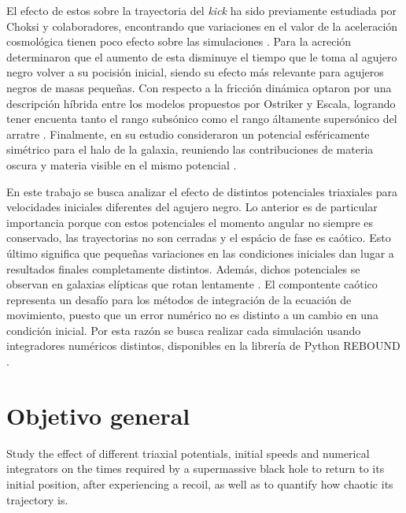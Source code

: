 	El efecto de estos sobre la trayectoria del \textit{kick} ha sido previamente estudiada por Choksi y colaboradores, encontrando que variaciones en el valor de la aceleraci\'on cosmol\'ogica tienen poco efecto sobre las simulaciones  \cite{choksi2017recoiling}. Para la acreci\'on determinaron que el aumento de esta disminuye el tiempo que le toma al agujero negro volver a su pocisi\'on inicial, siendo su efecto m\'as relevante para agujeros negros de masas peque\~nas. Con respecto a la fricci\'on din\'amica optaron por una descripci\'on h\'ibrida entre los modelos propuestos por Ostriker y Escala, logrando tener encuenta tanto el rango subs\'onico como el rango \'altamente supers\'onico del arratre \cite{ostriker1999dynamical, escala2005role}. Finalmente, en su estudio consideraron un potencial esf\'ericamente sim\'etrico para el halo de la galaxia, reuniendo las contribuciones de materia oscura y materia visible en el mismo potencial \cite{choksi2017recoiling}.
		
	En este trabajo se busca analizar el efecto de distintos potenciales triaxiales para velocidades iniciales diferentes del agujero negro. Lo anterior es de particular importancia porque con estos potenciales el momento angular no siempre es conservado, las trayectorias no son cerradas y el esp\'acio de fase es ca\'otico. Esto \'ultimo significa que pequeñas variaciones en las condiciones iniciales dan lugar a resultados finales completamente distintos. Adem\'as, dichos potenciales se observan en galaxias el\'ipticas que rotan lentamente \cite{buote2002chandra, binney1978elliptical}. El compontente ca\'otico representa un desaf\'io para los m\'etodos de integraci\'on de la ecuaci\'on de movimiento, puesto que un error num\'erico no es distinto a un cambio en una condici\'on inicial. Por esta raz\'on se busca realizar cada simulaci\'on usando integradores num\'ericos distintos, disponibles en la librer\'ia de Python REBOUND \cite{larson2017modeling}.
	
\section{Objetivo general}
	Study the effect of different triaxial potentials, initial speeds and numerical integrators on the times required by a supermassive black hole to return to its initial position, after experiencing a recoil, as well as to quantify how chaotic its trajectory is.
	
